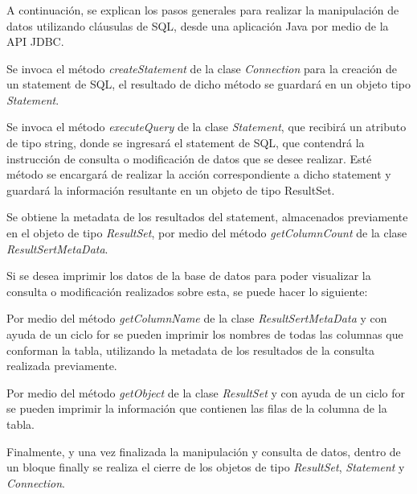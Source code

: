 \documentclass[10pt,a4paper]{article} %
\begin{document}
	\subsubsection{}
	{\large A continuaci{\' o}n, se explican los pasos generales para realizar la manipulaci{\' o}n de datos utilizando cl{\' a}usulas de SQL, desde una aplicaci{\' o}n Java por medio de la API JDBC.
		
		\begin{enumerate}       
			{     
				\item Se invoca el método \textit{createStatement} de la clase \textit{Connection} para la creaci{\' o}n de un statement de SQL, el resultado de dicho método se guardar{\' a} en un objeto tipo \textit{Statement}.
				\item Se invoca el método \textit{executeQuery} de la clase \textit{Statement}, que recibir{\' a} un atributo de tipo string, donde se ingresar{\' a} el statement de SQL, que contendr{\' a} la instrucci{\' o}n de consulta o modificaci{\' o}n de datos que se desee realizar. Esté método se encargar{\' a} de realizar la acci{\' o}n correspondiente a dicho statement y guardar{\' a} la informaci{\' o}n resultante en un objeto de tipo ResultSet.
				\item Se obtiene la metadata de los resultados del statement, almacenados previamente en el objeto de tipo \textit{ResultSet}, por medio del método \textit{getColumnCount} de la clase \textit{ResultSertMetaData}.
				\item Si se desea imprimir los datos de la base de datos para poder visualizar la consulta o modificaci{\' o}n realizados sobre esta, se puede hacer lo siguiente:
				
				\begin{enumerate}       
					{    
						\item Por medio del método \textit{getColumnName} de la clase \textit{ResultSertMetaData} y con ayuda de un ciclo for se pueden imprimir los nombres de todas las columnas que conforman la tabla, utilizando la metadata de los resultados de la consulta realizada previamente.
						\item Por medio del método \textit{getObject} de la clase \textit{ResultSet} y con ayuda de un ciclo for se pueden imprimir la informaci{\' o}n que contienen las filas de la columna de la tabla.
					}
				\end{enumerate}
				
				\item  Finalmente, y una vez finalizada la manipulaci{\' o}n y consulta de datos, dentro de un bloque finally se realiza el cierre de los objetos de tipo \textit{ResultSet}, \textit{Statement} y \textit{Connection}.   
			}
		\end{enumerate}
	}
	
\end{document}
